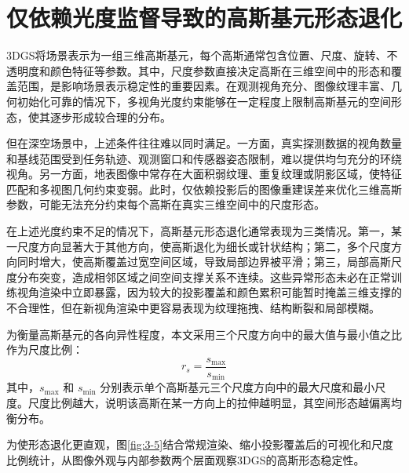 \section{仅依赖光度监督导致的高斯基元形态退化}

3DGS将场景表示为一组三维高斯基元，每个高斯通常包含位置、尺度、旋转、不透明度和颜色特征等参数。其中，尺度参数直接决定高斯在三维空间中的形态和覆盖范围，是影响场景表示稳定性的重要因素。在观测视角充分、图像纹理丰富、几何初始化可靠的情况下，多视角光度约束能够在一定程度上限制高斯基元的空间形态，使其逐步形成较合理的分布。

但在深空场景中，上述条件往往难以同时满足。一方面，真实探测数据的视角数量和基线范围受到任务轨迹、观测窗口和传感器姿态限制，难以提供均匀充分的环绕视角。另一方面，地表图像中常存在大面积弱纹理、重复纹理或阴影区域，使特征匹配和多视图几何约束变弱。此时，仅依赖投影后的图像重建误差来优化三维高斯参数，可能无法充分约束每个高斯在真实三维空间中的尺度形态。

在上述光度约束不足的情况下，高斯基元形态退化通常表现为三类情况。第一，某一尺度方向显著大于其他方向，使高斯退化为细长或针状结构；第二，多个尺度方向同时增大，使高斯覆盖过宽空间区域，导致局部边界被平滑；第三，局部高斯尺度分布突变，造成相邻区域之间空间支撑关系不连续。这些异常形态未必在正常训练视角渲染中立即暴露，因为较大的投影覆盖和颜色累积可能暂时掩盖三维支撑的不合理性，但在新视角渲染中更容易表现为纹理拖拽、结构断裂和局部模糊。

为衡量高斯基元的各向异性程度，本文采用三个尺度方向中的最大值与最小值之比作为尺度比例：
\[
r_s=\frac{s_{\max}}{s_{\min}}
\]
其中，\(s_{\max}\) 和 \(s_{\min}\) 分别表示单个高斯基元三个尺度方向中的最大尺度和最小尺度。尺度比例越大，说明该高斯在某一方向上的拉伸越明显，其空间形态越偏离均衡分布。

为使形态退化更直观，图\ref{fig:3-5}结合常规渲染、缩小投影覆盖后的可视化和尺度比例统计，从图像外观与内部参数两个层面观察3DGS的高斯形态稳定性。

